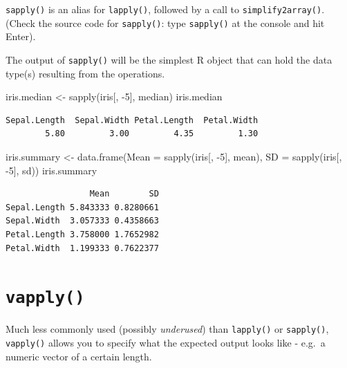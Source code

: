 \documentclass[
]{book}
\makeatletter
\newenvironment{Shaded}{\begin{snugshade}}{\end{snugshade}}
\newcommand{\AttributeTok}[1]{\textcolor[rgb]{0.77,0.63,0.00}{#1}}
\newcommand{\DecValTok}[1]{\textcolor[rgb]{0.00,0.00,0.81}{#1}}
\newcommand{\FunctionTok}[1]{\textcolor[rgb]{0.00,0.00,0.00}{#1}}
\newcommand{\NormalTok}[1]{#1}
\newcommand{\OtherTok}[1]{\textcolor[rgb]{0.56,0.35,0.01}{#1}}
\newcommand{\SpecialCharTok}[1]{\textcolor[rgb]{0.00,0.00,0.00}{#1}}
\newenvironment{kframe}{%
\medskip{}
\setlength{\fboxsep}{.8em}
 \def\at@end@of@kframe{}%
 \ifinner\ifhmode%
  \def\at@end@of@kframe{\end{minipage}}%
  \begin{minipage}{\columnwidth}%
 \fi\fi%
 \def\FrameCommand##1{\hskip\@totalleftmargin \hskip-\fboxsep
 \colorbox{shadecolor}{##1}\hskip-\fboxsep
     \hskip-\linewidth \hskip-\@totalleftmargin \hskip\columnwidth}%
 \MakeFramed {\advance\hsize-\width
   \@totalleftmargin\z@ \linewidth\hsize
   \@setminipage}}%
 {\par\unskip\endMakeFramed%
 \at@end@of@kframe}
\newenvironment{rmdblock}[1]
  {
  \begin{itemize}
  \renewcommand{\labelitemi}{
    \raisebox{-.7\height}[0pt][0pt]{
      {\setkeys{Gin}{width=3em,keepaspectratio}\texttt{[image: images/\#1]}}
    }
  }
  \setlength{\fboxsep}{1em}
  \begin{kframe}
  \item
  }
  {
  \end{kframe}
  \end{itemize}
  }
\newenvironment{note}
  {\begin{rmdblock}{note}}
  {\end{rmdblock}}
\makeatother
\begin{document}
\texttt{sapply()} is an alias for \texttt{lapply()}, followed by a call to \texttt{simplify2array()}.\\
(Check the source code for \texttt{sapply()}: type \texttt{sapply()} at the console and hit Enter).

\begin{note}
The output of \texttt{sapply()} will be the simplest R object that can
hold the data type(s) resulting from the operations.
\end{note}

\begin{Shaded}
\begin{Highlighting}[]
\NormalTok{iris.median }\OtherTok{\textless{}{-}} \FunctionTok{sapply}\NormalTok{(iris[, }\SpecialCharTok{{-}}\DecValTok{5}\NormalTok{], median)}
\NormalTok{iris.median}
\end{Highlighting}
\end{Shaded}

\begin{verbatim}
Sepal.Length  Sepal.Width Petal.Length  Petal.Width 
        5.80         3.00         4.35         1.30 
\end{verbatim}

\begin{Shaded}
\begin{Highlighting}[]
\NormalTok{iris.summary }\OtherTok{\textless{}{-}} \FunctionTok{data.frame}\NormalTok{(}\AttributeTok{Mean =} \FunctionTok{sapply}\NormalTok{(iris[, }\SpecialCharTok{{-}}\DecValTok{5}\NormalTok{], mean),}
                           \AttributeTok{SD =} \FunctionTok{sapply}\NormalTok{(iris[, }\SpecialCharTok{{-}}\DecValTok{5}\NormalTok{], sd))}
\NormalTok{iris.summary}
\end{Highlighting}
\end{Shaded}

\begin{verbatim}
                 Mean        SD
Sepal.Length 5.843333 0.8280661
Sepal.Width  3.057333 0.4358663
Petal.Length 3.758000 1.7652982
Petal.Width  1.199333 0.7622377
\end{verbatim}

\hypertarget{vapply}{%
\section{\texorpdfstring{\texttt{vapply()}}{vapply()}}\label{vapply}}

Much less commonly used (possibly \emph{underused}) than \texttt{lapply()} or \texttt{sapply()}, \texttt{vapply()} allows you to specify what the expected output looks like - e.g.~a numeric vector of a certain length.
\end{document}

